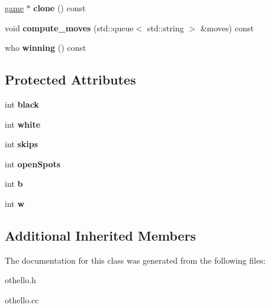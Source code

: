 \begin{DoxyCompactItemize}
\mbox{\label{classmain__savitch__14_1_1_othello_a7a5f8495f1a61f6e7b3968e919013c18}} 
\mbox{\hyperlink{classmain__savitch__14_1_1game}{game}} $\ast$ {\bfseries clone} () const
\item 
\mbox{\label{classmain__savitch__14_1_1_othello_a921d4ffa277b0250f187f20b9598ebb1}} 
void {\bfseries compute\+\_\+moves} (std\+::queue$<$ std\+::string $>$ \&moves) const
\item 
\mbox{\label{classmain__savitch__14_1_1_othello_a4ea78b18eea66c944c0a9356349e0fd4}} 
who {\bfseries winning} () const
\end{DoxyCompactItemize}
\subsection*{Protected Attributes}
\begin{DoxyCompactItemize}
\item 
\mbox{\label{classmain__savitch__14_1_1_othello_a2eed818925f68d5678b78107a3298138}} 
int {\bfseries black}
\item 
\mbox{\label{classmain__savitch__14_1_1_othello_a7d5f59b1e581ed7a8145debeecf4f310}} 
int {\bfseries white}
\item 
\mbox{\label{classmain__savitch__14_1_1_othello_a85d4ce17512d8dbf85a313a27eea0644}} 
int {\bfseries skips}
\item 
\mbox{\label{classmain__savitch__14_1_1_othello_a15045e3e94c34afe08240885e230d502}} 
int {\bfseries open\+Spots}
\item 
\mbox{\label{classmain__savitch__14_1_1_othello_a98fbc46241d2f5e05ccb4b66f11535bf}} 
int {\bfseries b}
\item 
\mbox{\label{classmain__savitch__14_1_1_othello_a1b11c5fe33e30a94ed39e8cb55caf37e}} 
int {\bfseries w}
\end{DoxyCompactItemize}
\subsection*{Additional Inherited Members}


The documentation for this class was generated from the following files\+:\begin{DoxyCompactItemize}
\item 
othello.\+h\item 
othello.\+cc\end{DoxyCompactItemize}
